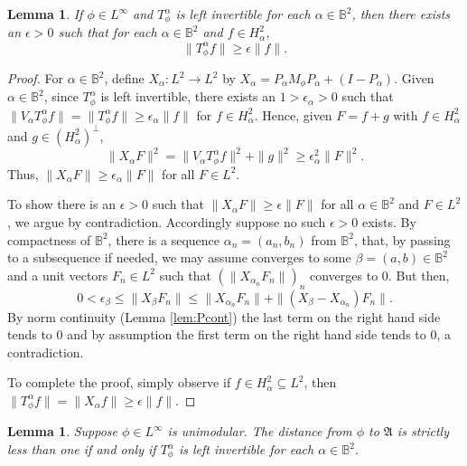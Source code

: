 \documentclass[12pt]{amsart}
\newtheorem{lemma}[theorem]{Lemma}
\theoremstyle{definition}
\theoremstyle{remark}
\numberwithin{equation}{section}
\begin{document}
\begin{lemma}
\label{lem:boundedbelow}
 If $\phi\in L^\infty$ and  $T^\alpha_\phi$ is left invertible for each $\alpha\in{\mathbb{B}^2}$, then there exists an $\epsilon > 0$ such that
for each $\alpha\in {\mathbb{B}^2}$ and $f\in H^2_\alpha$,
\[
\|T^\alpha_\phi f\|\ge \epsilon \|f\|.
\]
\end{lemma}

\begin{proof}
 For $\alpha \in {\mathbb{B}^2}$, define $X_\alpha:L^2\to L^2$ by $X_\alpha = P_\alpha M_\phi P_\alpha + (I-P_\alpha)$. 
 Given $\alpha\in{\mathbb{B}^2}$,  since $T^\alpha_\phi$ is left invertible, there exists an $1>\epsilon_\alpha>0$ such that 
 $\|{V_{\alpha}}T^\alpha_\phi f\|=\|T^\alpha_\phi f\|\ge \epsilon_\alpha \|f\|$ for $f\in H^2_\alpha$. Hence, given $F=f+g$ with $f\in H^2_\alpha$ and $g\in (H^2_\alpha)^\perp$,
\[
 \|X_\alpha F\|^2 = \|{V_{\alpha}}T^\alpha_\phi f\|^2 +\|g\|^2 \ge \epsilon_\alpha^2 \|F\|^2.
\]
Thus,  $\|X_\alpha F\|\ge \epsilon_\alpha \|F\|$ for all $F\in L^2$.

To show there is an $\epsilon>0$ such that $\|X_\alpha F\|\ge \epsilon \|F\|$ for all $\alpha \in {\mathbb{B}^2}$ and $F\in L^2$, we argue by contradiction.
Accordingly suppose no such $\epsilon>0$ exists. 
 By compactness of ${\mathbb{B}^2}$,  there is a sequence $\alpha_n=(a_n,b_n)$ from ${\mathbb{B}^2}$,  that, by passing to a subsequence if needed,
we may assume converges to some $\beta=(a,b)\in {\mathbb{B}^2}$ and a unit vectors $F_n \in L^2$ such that $(\|X_{\alpha_n}F_n\|)_n$ converges to $0$.
But then,
\[
0< \epsilon_\beta \le  \|X_\beta F_n\|\le \|X_{\alpha_n}F_n\| + \|(X_{\beta}-X_{\alpha_n})F_n\|.
\]
By norm continuity (Lemma \ref{lem:Pcont}) the last term on the right hand side tends to $0$ and by assumption the first term on the right hand side 
tends to $0$, a contradiction. 

To complete the proof, simply observe if $f\in H^2_\alpha{\subseteq} L^2$, then $\|T^\alpha_\phi f\|=\|X_\alpha f\|\ge \epsilon \|f\|$.
\end{proof}

\begin{lemma}
\label{lem:left}
 Suppose $\phi\in L^\infty$ is unimodular. The distance from $\phi$ to  ${\mathfrak{A}}$ is strictly less than one if and only
if $T^\alpha_\phi$ is left invertible for each $\alpha\in {\mathbb{B}^2}$.
\end{lemma}
\end{document}
